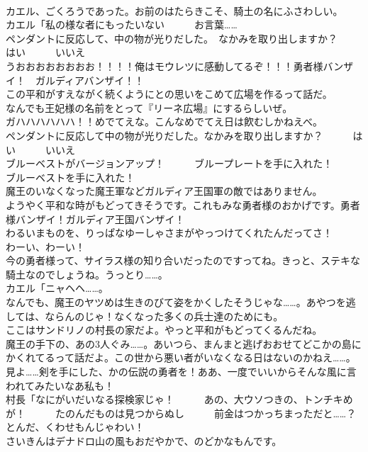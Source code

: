 \documentclass[8pt]{extreport}
\begin{document}
\begin{CJK}{UTF8}{min}
\\	カエル、ごくろうであった。お前のはたらきこそ、騎土の名にふさわしい。	
\\	カエル「私の様な者にもったいない　　　お言葉……	
\\	ペンダントに反応して、中の物が光りだした。　なかみを取り出しますか？　　　はい　　　いいえ	
\\	うおおおおおおおお！！！！俺はモウレツに感動してるぞ！！！勇者様バンザイ！　ガルディアバンザイ！！	
\\	この平和がすえながく続くようにとの思いをこめて広場を作るって話だ。	
\\	なんでも王妃様の名前をとって『リーネ広場』にするらしいぜ。	
\\	ガハハハハハハ！！めでてえな。こんなめでてえ日は飮むしかねえべ。	
\\	ペンダントに反応して中の物が光りだした。なかみを取り出しますか？　　　はい　　　いいえ	
\\	ブルーベストがバージョンアップ！　　　ブループレートを手に入れた！	
\\	ブルーベストを手に入れた！	
\\	魔王のいなくなった魔王軍などガルディア王国軍の敵ではありません。	
\\	ようやく平和な時がもどってきそうです。これもみな勇者様のおかげです。勇者様バンザイ！ガルディア王国バンザイ！	
\\	わるいまものを、りっぱなゆーしゃさまがやっつけてくれたんだってさ！	
\\	わーい、わーい！	
\\	今の勇者様って、サイラス様の知り合いだったのですってね。きっと、ステキな騎土なのでしょうね。うっとり……。	
\\	カエル「ニャヘヘ……。	
\\	なんでも、魔王のヤツめは生きのびて姿をかくしたそうじゃな……。あやつを逃しては、ならんのじゃ！なくなった多くの兵士達のためにも。	
\\	ここはサンドリノの村長の家だよ。やっと平和がもどってくるんだね。	
\\	魔王の手下の、あの3人ぐみ……。あいつら、まんまと逃げおおせてどこかの島にかくれてるって話だよ。この世から悪い者がいなくなる日はないのかねえ……。	
\\	見よ……剣を手にした、かの伝説の勇者を！ああ、一度でいいからそんな風に言われてみたいなあ私も！	
\\	村長「なにがいだいなる探検家じゃ！　　　あの、大ウソつきの、トンチキめが！　　　たのんだものは見つからぬし　　　前金はつかっちまっただと……？　　　とんだ、くわせもんじゃわい！	
\\	さいきんはデナドロ山の風もおだやかで、のどかなもんです。	

\end{CJK}
\end{document}
